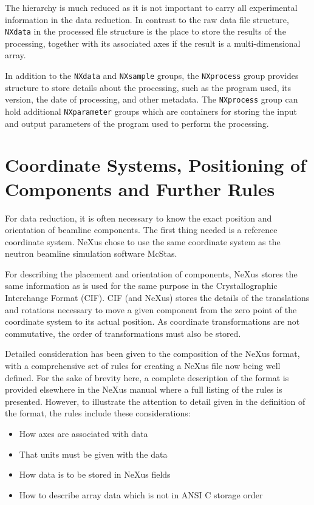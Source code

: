 \documentclass[%
 aip,
rsi,
 amsmath,amssymb,
 reprint,%
]{revtex4-1}
\begin{document}
The hierarchy is much reduced as it is not important to carry all experimental information in the data 
reduction. In contrast to the raw data file structure, \texttt{NXdata} in the processed file structure is the place 
to store the results of the processing, together with its associated axes if the result is a multi-dimensional array.  

In addition to the \texttt{NXdata} and \texttt{NXsample} groups, 
the \texttt{NXprocess} group provides structure to store details 
about the processing, such as the program used, its version, 
the date of processing, and other metadata. 
The \texttt{NXprocess} group can hold additional \texttt{NXparameter} groups which are containers 
for storing the input and output parameters of the program used to perform the processing. 

\section{Coordinate Systems, Positioning of Components and Further Rules}

For data reduction, it is often necessary to know the exact position and orientation of beamline components. 
The first thing needed is a reference coordinate system. NeXus chose to use the same coordinate system as the 
neutron beamline simulation software McStas\cite{mcstas}. 

For describing the placement and orientation of components, NeXus stores the same information as is used for the 
same purpose in the Crystallographic Interchange Format (CIF)\cite{ITCVG}. CIF (and NeXus) stores the details 
of the translations and rotations necessary to move a given component from the zero point of the coordinate 
system to its actual position. As coordinate transformations are not commutative, the order of transformations 
must also be stored.

Detailed consideration has been given to the composition of the NeXus format, 
with a comprehensive set of rules for creating a NeXus file now being well defined. 
For the sake of brevity here, a complete description of the format is 
provided elsewhere in the NeXus manual\cite{nxman} where a full listing of the 
rules is presented. However, to illustrate the attention to detail given in the 
definition of the format, the rules include these considerations:
\begin{itemize}
\item How axes are associated with data
\item That units must be given with the data
\item How data is to be stored in NeXus fields
\item How to describe array data which is not in ANSI C storage order
\end{itemize}
\end{document}

